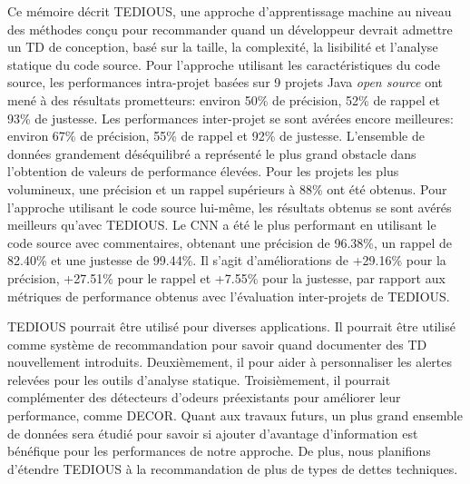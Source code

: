 Ce m\'{e}moire d\'{e}crit \ac{TEDIOUS}, une approche d'apprentissage machine au niveau des m\'{e}thodes con\c{c}u pour recommander quand un d\'{e}veloppeur devrait admettre un \ac{TD} de conception, bas\'{e} sur la taille, la complexit\'{e}, la lisibilit\'{e} et l'analyse statique du code source. Pour l'approche utilisant les caract\'{e}ristiques du code source, les performances intra-projet bas\'{e}es sur 9 projets Java \emph{open source} ont men\'{e} \`{a} des r\'{e}sultats prometteurs: environ 50\% de pr\'{e}cision, 52\% de rappel et 93\% de justesse. Les performances inter-projet se sont av\'{e}r\'{e}es encore meilleures: environ 67\% de pr\'{e}cision, 55\% de rappel et 92\% de justesse. L'ensemble de donn\'{e}es grandement d\'{e}s\'{e}quilibr\'{e} a repr\'{e}sent\'{e} le plus grand obstacle dans l'obtention de valeurs de performance \'{e}lev\'{e}es. Pour les projets les plus volumineux, une pr\'{e}cision et un rappel sup\'{e}rieurs \`{a} 88\% ont \'{e}t\'{e} obtenus. Pour l'approche utilisant le code source lui-m\^{e}me, les r\'{e}sultats obtenus se sont av\'{e}r\'{e}s meilleurs qu'avec TEDIOUS. Le CNN a \'{e}t\'{e} le plus performant en utilisant le code source avec commentaires, obtenant une pr\'{e}cision de 96.38\%, un rappel de 82.40\% et une justesse de 99.44\%. Il s'agit d'am\'{e}liorations de +29.16\% pour la pr\'{e}cision, +27.51\% pour le rappel et +7.55\% pour la justesse, par rapport aux m\'{e}triques de performance obtenus avec l'\'{e}valuation inter-projets de TEDIOUS.

\ac{TEDIOUS} pourrait \^{e}tre utilis\'{e} pour diverses applications. Il pourrait \^{e}tre utilis\'{e} comme syst\`{e}me de recommandation pour savoir quand documenter des \ac{TD} nouvellement introduits. Deuxi\`{e}mement, il pour aider \`{a} personnaliser les alertes relev\'{e}es pour les outils d'analyse statique. Troisi\`{e}mement, il pourrait compl\'{e}menter des d\'{e}tecteurs d'odeurs pr\'{e}existants pour am\'{e}liorer leur performance, comme \ac{DECOR}. Quant aux travaux futurs, un plus grand ensemble de donn\'{e}es sera \'{e}tudi\'{e} pour savoir si ajouter d'avantage d'information est b\'{e}n\'{e}fique pour les performances de notre approche. De plus, nous planifions d'\'{e}tendre \ac{TEDIOUS} \`{a} la recommandation de plus de types de dettes techniques.























